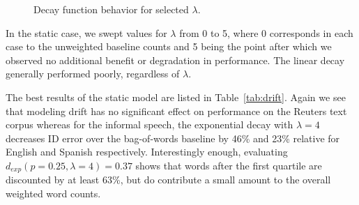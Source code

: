 \begin{figure}[t]
		\centering
      \caption[Decay function behavior]{Decay function behavior for selected $\lambda$.\label{ch3DecayExample}}
\end{figure}

In the static case, we swept values for $\lambda$ from 0 to 5, where 0 corresponds in each case to the unweighted baseline counts and 5 being the point after which we observed no additional benefit or degradation in performance.   The linear decay generally performed poorly, regardless of $\lambda$.

The best results of the static model are listed in Table~\ref{tab:drift}.  Again we see that modeling drift has no significant effect on performance on the Reuters text corpus whereas for the informal speech, the exponential decay with $\lambda=4$ decreases ID error over the bag-of-words baseline by 46\% and 23\% relative for English and Spanish respectively.  Interestingly enough, evaluating $d_{exp}(p=0.25, \lambda=4)=0.37$ shows that words after the first quartile are discounted by at least 63\%, but do contribute a small amount to the overall weighted word counts.

